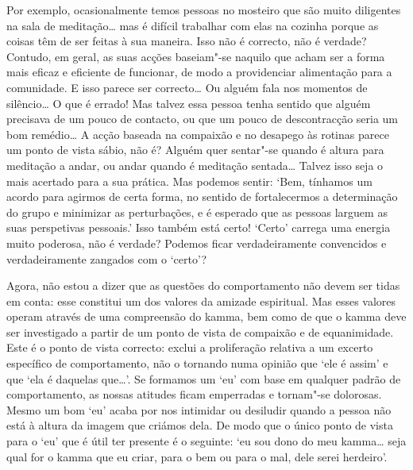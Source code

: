 Por exemplo, ocasionalmente temos pessoas no mosteiro que são muito diligentes
na sala de meditação\ldots{} mas é difícil trabalhar com elas na cozinha porque
as coisas têm de ser feitas à sua maneira. Isso não é correcto, não é verdade?
Contudo, em geral, as suas acções baseiam"-se naquilo que acham ser a forma mais
eficaz e eficiente de funcionar, de modo a providenciar alimentação para a
comunidade. E isso parece ser correcto\ldots{} Ou alguém fala nos momentos de
silêncio\ldots{} O que é errado! Mas talvez essa pessoa tenha sentido que alguém
precisava de um pouco de contacto, ou que um pouco de descontracção seria um bom
remédio\ldots{} A acção baseada na compaixão e no desapego às rotinas parece um
ponto de vista sábio, não é? Alguém quer sentar"-se quando é altura para
meditação a andar, ou andar quando é meditação sentada\ldots{} Talvez isso seja
o mais acertado para a sua prática. Mas podemos sentir: `Bem, tínhamos um acordo
para agirmos de certa forma, no sentido de fortalecermos a determinação do grupo
e minimizar as perturbações, e é esperado que as pessoas larguem as suas
perspetivas pessoais.' Isso também está certo! `Certo' carrega uma energia muito
poderosa, não é verdade? Podemos ficar verdadeiramente convencidos e
verdadeiramente zangados com o `certo'?

Agora, não estou a dizer que as questões do comportamento não devem ser tidas em
conta: esse constitui um dos valores da amizade espiritual. Mas esses valores
operam através de uma compreensão do kamma, bem como de que o kamma deve ser
investigado a partir de um ponto de vista de compaixão e de equanimidade. Este é
o ponto de vista correcto: exclui a proliferação relativa a um excerto
específico de comportamento, não o tornando numa opinião que `ele é assim' e que
`ela é daquelas que\ldots{}'. Se formamos um `eu' com base em qualquer padrão de
comportamento, as nossas atitudes ficam emperradas e tornam"-se dolorosas. Mesmo
um bom `eu' acaba por nos intimidar ou desiludir quando a pessoa não está à
altura da imagem que criámos dela. De modo que o único ponto de vista para o
`eu' que é útil ter presente é o seguinte: `eu sou dono do meu kamma\ldots{}
seja qual for o kamma que eu criar, para o bem ou para o mal, dele serei
herdeiro'.

